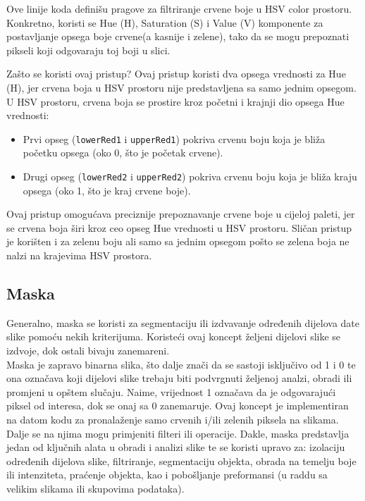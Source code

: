 \documentclass[a4paper,12pt]{article}
\begin{document}


Ove linije koda definišu pragove za filtriranje crvene boje u HSV color prostoru. 
Konkretno, koristi se Hue (H), Saturation (S) i Value (V) komponente za postavljanje opsega boje crvene(a kasnije i zelene), tako da se mogu prepoznati pikseli koji odgovaraju toj boji u slici.

Zašto se koristi ovaj pristup?
Ovaj pristup koristi dva opsega vrednosti za Hue (H), jer crvena boja u HSV prostoru nije predstavljena sa samo jednim opsegom. 
U HSV prostoru, crvena boja se prostire kroz početni i krajnji dio opsega Hue vrednosti:

\begin{itemize}
    \item Prvi opseg (\texttt{lowerRed1} i \texttt{upperRed1}) pokriva crvenu boju koja je bliža početku opsega (oko 0, što je početak crvene).
    \item Drugi opseg (\texttt{lowerRed2} i \texttt{upperRed2}) pokriva crvenu boju koja je bliža kraju opsega (oko 1, što je kraj crvene boje).
\end{itemize}
Ovaj pristup omogućava preciznije prepoznavanje crvene boje u cijeloj paleti, jer se crvena boja širi kroz ceo opseg Hue vrednosti u HSV prostoru. 
Sličan pristup je korišten i za zelenu boju ali samo sa jednim opsegom pošto se zelena boja ne nalzi na krajevima HSV prostora.



\subsection{Maska}
Generalno, maska se koristi za segmentaciju ili izdvavanje određenih dijelova date slike pomoću nekih kriterijuma.
Koristeći ovaj koncept željeni dijelovi slike se izdvoje, dok ostali bivaju zanemareni. \\

Maska je zapravo binarna slika, što dalje znači da se sastoji isključivo od 1 i 0 te ona označava koji dijelovi slike trebaju biti podvrgnuti željenoj analzi, obradi ili promjeni u opštem slučaju. 
Naime, vrijednost 1 označava da je odgovarajući piksel od interesa, dok se onaj sa 0 zanemaruje. 
Ovaj koncept je implementiran na datom kodu za pronalaženje samo crvenih i/ili zelenih piksela na slikama. \\

Dalje se na njima mogu primjeniti filteri ili operacije. 
Dakle, maska predstavlja jedan od ključnih alata u obradi i analizi slike te se koristi upravo za: izolaciju određenih dijelova slike, filtriranje, segmentaciju objekta, obrada na temelju boje ili intenziteta, praćenje objekta, kao i pobošljanje preformansi (u raddu sa velikim slikama ili skupovima podataka).\\
\end{document}
